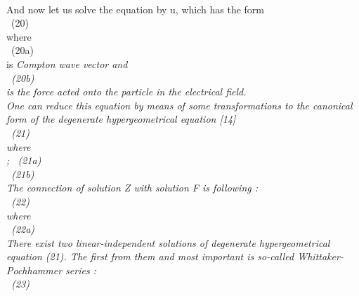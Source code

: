 \documentclass[a4paper,12pt] {article}
\begin{document}
\\ And now let us solve the equation by u, which has the form \\\coordHE{} \  (20)
\\ where \\\coordHE{} \ (20a)\\ is \it   Compton wave vector \rm  and \\\coordHE{}\rm  \  (20b)
\\  is the force acted onto  the particle in the electrical field.
\\ One can reduce this equation by means of some transformations to the \it canonical form \rm of the
\it degenerate hypergeometrical equation \rm[14] \\\coordHE{} \ (21)\\ where
\\\coordHE{} ;
\coordHE{} \  (21a) \\\coordHE{} \ (21b)
\\ The connection of solution Z with solution F is following :\\\coordHE{} \ (22)\\ where
 \\\coordHE{} \ (22a)\\ There exist two linear-independent solutions of
 degenerate hypergeometrical equation (21). The first from them and most important is so-called
 \it Whittaker- Pochhammer series :\\\coordHE{}\rm \ (23)
\end{document}
